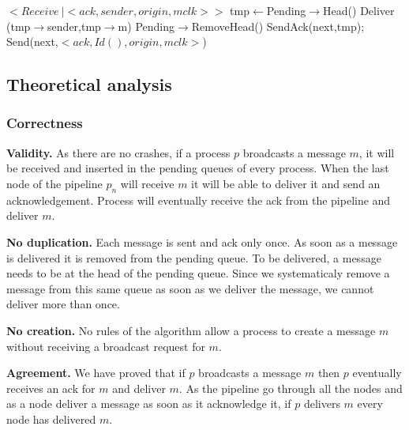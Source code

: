 \documentclass[a4paper]{article}
\begin{document}
\begin{algorithm}[H]
    \centering
    \begin{algorithmic}[5]
        \Event $<Receive\  | <ack,sender,origin, mclk>>$
        \State tmp$\gets$Pending$\rightarrow$Head()
        \State Deliver (tmp$\rightarrow$sender,tmp$\rightarrow$m)
        \State Pending$\rightarrow$RemoveHead()
        \EndWhile
        \State SendAck(next,tmp);
        \EndIf
        \Else
        \State Send(next,$<ack,Id(),origin,mclk>$)
        \EndIf
        \EndIf
        \EndEvent
    \end{algorithmic}
\end{algorithm}


\subsection{Theoretical analysis}
\subsubsection{Correctness}
\label{sec:pipelineack-proof}
\noindent\textbf{Validity.} As there are no crashes, if a process $p$
broadcasts a message $m$, it will be received and inserted in the pending
queues of every process. When the last node of the pipeline $p_n$ will
receive $m$ it will be able to deliver it and send an acknowledgement.
Process will eventually receive the ack from the pipeline and deliver $m$.

\bigskip
\noindent\textbf{No duplication.} Each message is sent and ack only once. As
soon as a message is delivered it is removed from the pending queue. To be
delivered, a message needs to be at the head of the pending queue. Since we
systematicaly remove a message from this same queue as soon as we deliver
the message, we cannot deliver more than once.

\bigskip
\noindent\textbf{No creation.} No rules of the algorithm allow a process to
create a message $m$ without receiving a broadcast request for $m$.

\bigskip
\noindent\textbf{Agreement.} We have proved that if $p$ broadcasts a message
$m$ then $p$ eventually receives an ack for $m$ and deliver $m$. As the
pipeline go through all the nodes and as a node deliver a message as soon as
it acknowledge it, if $p$ delivers $m$ every node has delivered $m$.
\end{document}
